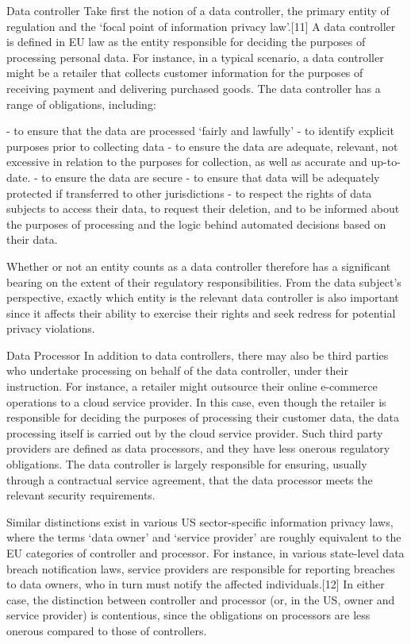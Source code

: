 \documentclass{acm_proc_article-sp}
\begin{document}
Data controller
Take first the notion of a data controller, the primary entity of regulation and the ‘focal point of information privacy law’.[11] A data controller is defined in EU law as the entity responsible for deciding the purposes of processing personal data. For instance, in a typical scenario, a data controller might be a retailer that collects customer information for the purposes of receiving payment and delivering purchased goods. The data controller has a range of obligations, including:
 
-       to ensure that the data are processed ‘fairly and lawfully’
-       to identify explicit purposes prior to collecting data
-       to ensure the data are adequate, relevant, not excessive in relation to the purposes for collection, as well as accurate and up-to-date.
-       to ensure the data are secure
-       to ensure that data will be adequately protected if transferred to other jurisdictions
-       to respect the rights of data subjects to access their data, to request their deletion, and to be informed about the purposes of processing and the logic behind automated decisions based on their data.
 
Whether or not an entity counts as a data controller therefore has a significant bearing on the extent of their regulatory responsibilities. From the data subject’s perspective, exactly which entity is the relevant data controller is also important since it affects their ability to exercise their rights and seek redress for potential privacy violations.
 
Data Processor
In addition to data controllers, there may also be third parties who undertake processing on behalf of the data controller, under their instruction. For instance, a retailer might outsource their online e-commerce operations to a cloud service provider. In this case, even though the retailer is responsible for deciding the purposes of processing their customer data, the data processing itself is carried out by the cloud service provider. Such third party providers are defined as data processors, and they have less onerous regulatory obligations. The data controller is largely responsible for ensuring, usually through a contractual service agreement, that the data processor meets the relevant security requirements.
 
Similar distinctions exist in various US sector-specific information privacy laws, where the terms ‘data owner’ and ‘service provider’ are roughly equivalent to the EU categories of controller and processor. For instance, in various state-level data breach notification laws, service providers are responsible for reporting breaches to data owners, who in turn must notify the affected individuals.[12] In either case, the distinction between controller and processor (or, in the US, owner and service provider) is contentious, since the obligations on processors are less onerous compared to those of controllers.
 
\end{document}
